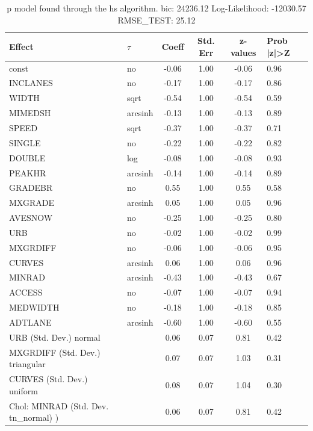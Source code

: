 \begin{table}
	\caption{p model found through the hs algorithm. bic: 24236.12 Log-Likelihood: -12030.57 RMSE_TEST: 25.12}
	\begin{center}
		\begin{tabular}{|l|l|c|c|c|l|}
			\hline
			Effect & $\tau$ & Coeff & Std. Err & z-values & Prob |z|>Z \\
			\hline
			const & no & -0.06 & 1.00 & -0.06 & 0.96 \\
			\hline
			INCLANES & no & -0.17 & 1.00 & -0.17 & 0.86 \\
			\hline
			WIDTH & sqrt & -0.54 & 1.00 & -0.54 & 0.59 \\
			\hline
			MIMEDSH & arcsinh & -0.13 & 1.00 & -0.13 & 0.89 \\
			\hline
			SPEED & sqrt & -0.37 & 1.00 & -0.37 & 0.71 \\
			\hline
			SINGLE & no & -0.22 & 1.00 & -0.22 & 0.82 \\
			\hline
			DOUBLE & log & -0.08 & 1.00 & -0.08 & 0.93 \\
			\hline
			PEAKHR & arcsinh & -0.14 & 1.00 & -0.14 & 0.89 \\
			\hline
			GRADEBR & no & 0.55 & 1.00 & 0.55 & 0.58 \\
			\hline
			MXGRADE & arcsinh & 0.05 & 1.00 & 0.05 & 0.96 \\
			\hline
			AVESNOW & no & -0.25 & 1.00 & -0.25 & 0.80 \\
			\hline
			URB & no & -0.02 & 1.00 & -0.02 & 0.99 \\
			\hline
			MXGRDIFF & no & -0.06 & 1.00 & -0.06 & 0.95 \\
			\hline
			CURVES & arcsinh & 0.06 & 1.00 & 0.06 & 0.96 \\
			\hline
			MINRAD & arcsinh & -0.43 & 1.00 & -0.43 & 0.67 \\
			\hline
			ACCESS & no & -0.07 & 1.00 & -0.07 & 0.94 \\
			\hline
			MEDWIDTH & no & -0.18 & 1.00 & -0.18 & 0.85 \\
			\hline
			ADTLANE & arcsinh & -0.60 & 1.00 & -0.60 & 0.55 \\
			\hline
			URB (Std. Dev.) normal &  & 0.06 & 0.07 & 0.81 & 0.42 \\
			\hline
			MXGRDIFF (Std. Dev.) triangular &  & 0.07 & 0.07 & 1.03 & 0.31 \\
			\hline
			CURVES (Std. Dev.) uniform &  & 0.08 & 0.07 & 1.04 & 0.30 \\
			\hline
			 Chol: MINRAD (Std. Dev. tn_normal) ) &  & 0.06 & 0.07 & 0.81 & 0.42 \\

\end{tabular}
\end{center}
\end{table}
